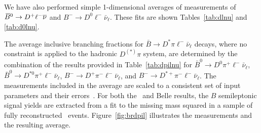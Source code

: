 We have also performed simple 1-dimensional averages of measurements
of $\kern 0.18em\overline{\kern -0.18em B}{}^0 \to D^{+}\ell^{-}\overline{\nu}$ and $B^-\to D^0\ell^-\bar\nu_\ell$. These fits are
shown Tables~\ref{tab:dlnu} and \ref{tab:d0lnu}.




\label{slbdecays_dpilnu}

The average inclusive branching fractions for $\bar{B} \to D^{*}\pi
\ell^-\bar{\nu}_{\ell}$ decays, where no constraint is applied to the
hadronic $D^{(*)}\pi$ system, are determined by the
combination of the results provided in Table~\ref{tab:dpilnu} for 
$\bar{B}^0 \to D^0 \pi^+ \ell^-\bar{\nu}_{\ell}$, $\bar{B}^0 \to D^{*0} \pi^+
\ell^-\bar{\nu}_{\ell}$, 
$B^- \to D^+ \pi^-
\ell^-\bar{\nu}_{\ell}$, and $B^- \to D^{*+} \pi^- \ell^-\bar{\nu}_{\ell}$.
The measurements included in the average 
are scaled to a consistent set of input
parameters and their errors~\cite{HFAG_sl:inputparams}.
For both the \babar\ and Belle results, the $B$ semileptonic signal yields are
 extracted from a fit to the missing mass squared in a sample of fully
 reconstructed \BB\ events.  
Figure~\ref{fig:brdpil} illustrates the measurements and the
resulting average.




